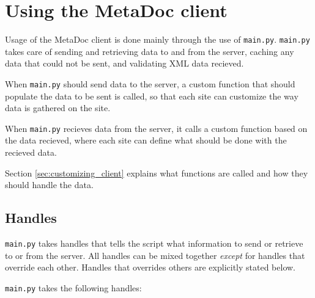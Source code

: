 \newpage
\section{Using the MetaDoc client}
Usage of the MetaDoc client is done mainly through the use of \texttt{main.py}.
\texttt{main.py} takes care of sending and retrieving data to and from the 
server, caching any data that could not be sent, and validating XML data 
recieved.

When \texttt{main.py} should send data to the server, a custom function that
should populate the data to be sent is called, so that each site can customize
the way data is gathered on the site. 

When \texttt{main.py} recieves data from the server, it calls a custom function
based on the data recieved, where each site can define what should be done with
the recieved data.

Section \ref{sec:customizing_client} explains what functions are called and how
they should handle the data. 

\subsection{Handles}
\label{sec:handles}
\texttt{main.py} takes handles that tells the script what information to send
or retrieve to or from the server. All handles can be mixed together
\textit{except} for handles that override each other. Handles that overrides
others are explicitly stated below.

\texttt{main.py} takes the following handles:

